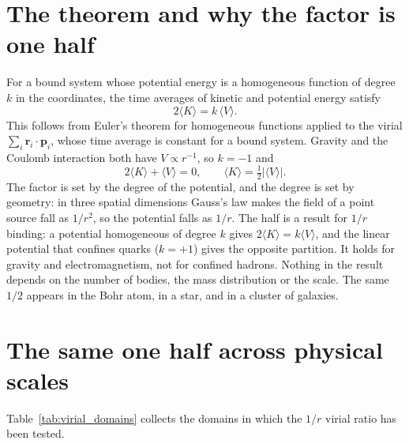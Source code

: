 \section{The theorem and why the factor is one half}
For a bound system whose potential energy is a homogeneous function of degree $k$ in the coordinates, the time averages of kinetic and potential energy satisfy
\begin{equation}
2\langle K\rangle=k\,\langle V\rangle .
\end{equation}
This follows from Euler's theorem for homogeneous functions applied to the virial $\sum_i\mathbf r_i\cdot\mathbf p_i$, whose time average is constant for a
bound system. Gravity and the Coulomb interaction both have $V\propto r^{-1}$, so $k=-1$ and
\begin{equation}
2\langle K\rangle+\langle V\rangle=0,\qquad \langle K\rangle=\tfrac12|\langle V\rangle| .
\end{equation}
The factor is set by the degree of the potential, and the degree is set by geometry: in three spatial dimensions Gauss's law makes the field of a point source
fall as $1/r^2$, so the potential falls as $1/r$. The half is a result for $1/r$ binding: a potential homogeneous of degree $k$ gives $2\langle K\rangle=k\langle V\rangle$, and
the linear potential that confines quarks ($k=+1$) gives the opposite partition. It holds for gravity and electromagnetism, not for confined hadrons. Nothing in the result depends on the number of bodies, the mass distribution or the scale. The same
$1/2$ appears in the Bohr atom, in a star, and in a cluster of galaxies.

\section{The same one half across physical scales}
Table~\ref{tab:virial_domains} collects the domains in which the $1/r$ virial ratio has been tested.

